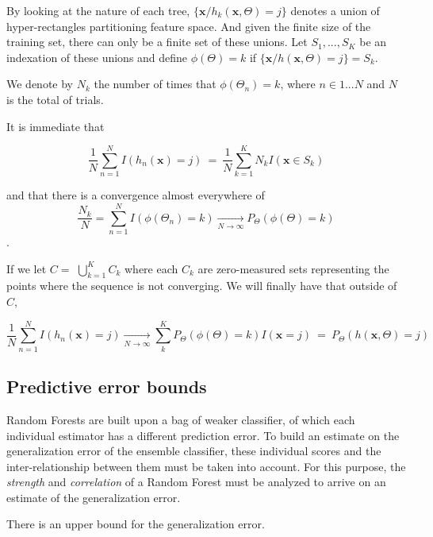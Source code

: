 By looking at the nature of each tree, $\{\textbf{x} / h_k(\textbf{x}, \Theta) = j \}$ denotes a union of hyper-rectangles partitioning feature space. And given the finite size of the training set, there can only be a finite set of these unions. Let $S_1, ..., S_K$ be an indexation of these unions and define $\phi(\Theta) = k $ if $\{\textbf{x} / h(\textbf{x}, \Theta) = j \} = S_k$. 

We denote by $N_k$ the number of times that $\phi(\Theta_n) =k $, where $n \in {1...N}$ and $N$ is the total of trials.

It is immediate that 

$$ \frac{1}{N} \sum_{n=1}^N I(h_n(\textbf{x}) = j) \ = \  \frac{1}{N} \sum_{k=1}^K N_k I(\textbf{x} \in S_k)  $$

and that there is a convergence almost everywhere of $$ \frac{N_k}{N} = \sum_{n=1}^N  I(\phi(\Theta_n) = k)  \xrightarrow[N \to \infty]{}   P_{\Theta}(\phi(\Theta)= k)$$. 

If we let $C = $ $\bigcup\limits_{k=1}^{K} C_{k}$ where each $C_k$ are zero-measured sets representing the points where the sequence is not converging. We will finally have that  outside of $C$, 

$$ \frac{1}{N} \sum_{n=1}^N I(h_n(\textbf{x}) = j) \xrightarrow[N \to \infty]{} \sum_k^K    P_{\Theta}(\phi(\Theta)= k) I(\textbf{x} =j ) \ = \ P_{\Theta}(h(\textbf{x}, \Theta) = j)  $$ 





\subsection{Predictive error bounds}

Random Forests are built upon a bag of weaker classifier, of which each individual estimator has a different prediction error. To build an estimate on the generalization error of the ensemble classifier, these individual scores and the inter-relationship between them must be taken into account. For this purpose, the \textit{strength} and \textit{correlation} of a Random Forest must be analyzed to arrive on an estimate of the generalization error.


\begin{theorem}
There is an upper bound for the generalization error.
\end{theorem}

